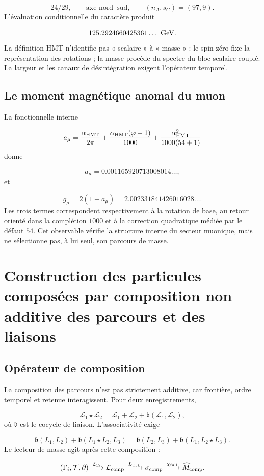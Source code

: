 \[
 24/29,\qquad \text{axe nord--sud},\qquad
 (n_A,s_C)=(97,9).
\]
L'évaluation conditionnelle du caractère produit

\[
 125.2924660425361\ldots\ {\rm GeV}.
\]
La définition HMT n'identifie pas « scalaire » à « masse » : le spin zéro fixe la représentation des rotations ; la masse procède du spectre du bloc scalaire couplé. La largeur et les canaux de désintégration exigent l'opérateur temporel.

\subsection{Le moment magnétique anomal du muon}
La fonctionnelle interne

\[
 a_\mu=
 \frac{\alpha_{\rm HMT}}{2\pi}
 +\frac{\alpha_{\rm HMT}(\varphi-1)}{1000}
 +\frac{\alpha_{\rm HMT}^2}{1000(54+1)}
\]
donne

\[
 a_\mu=0.001165920713008014\ldots,
\]
et

\[
 g_\mu=2(1+a_\mu)
 =2.002331841426016028\ldots.
\]
Les trois termes correspondent respectivement à la rotation de base, au retour orienté dans la complétion \(1000\) et à la correction quadratique médiée par le défaut \(54\). Cet observable vérifie la structure interne du secteur muonique, mais ne sélectionne pas, à lui seul, son parcours de masse.

\section{Construction des particules composées par composition non additive des parcours et des liaisons}
\subsection{Opérateur de composition}
La composition des parcours n'est pas strictement additive, car frontière, ordre temporel et retenue interagissent. Pour deux enregistrements,

\[
 \mathcal L_1\star\mathcal L_2
 =\mathcal L_1+\mathcal L_2
 +\mathfrak b(\mathcal L_1,\mathcal L_2),
\]
où \(\mathfrak b\) est le cocycle de liaison. L'associativité exige

\[
 \mathfrak b(L_1,L_2)
 +\mathfrak b(L_1\star L_2,L_3)
 =
 \mathfrak b(L_2,L_3)
 +\mathfrak b(L_1,L_2\star L_3).
\]
Le lecteur de masse agit après cette composition :

\[
 (\Gamma_i,\mathcal T,\partial)
 \xrightarrow{\mathfrak C_{12}}
 \mathcal L_{\rm comp}
 \xrightarrow{L_{\rm tick}}
 \sigma_{\rm comp}
 \xrightarrow{\chi_{\rm full}}
 \widehat M_{\rm comp}.
\]
